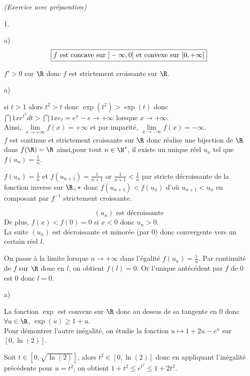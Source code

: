 \documentclass[11pt]{article}%
\begin{document}
\begin{exercice}{\it (Exercice avec préparation)}
\begin{noliste}{1.}
\begin{noliste}{a)}
\[
 \boxed{\text{$f$ est concave sur $ ]-\infty,0]$ et convexe sur $[0, +
\infty[$}}
\]
 \item $f' >0$ sur $\R$ donc $f$ est strictement croissante sur $\R$. 
 \end{noliste}
 \item \begin{noliste}{a)}
 \setlength{\itemsep}{2mm}
 \item si $t >1$ alors $t^{2} >t$ donc $\exp(t^{2}) > \exp(t)$ donc
$\dint{1}{x} e^{t^{2}}dt > \dint{1}{x} e_{t} = e^{x} - e \to + \infty $
lorsque $x \to + \infty$.\\
Ainsi, $\lim \limits_{x \to + \infty } f(x) = + \infty$ et par
imparité, $\lim \limits_{ x \to -\infty } f(x) = -\infty$.\\
 $f$ est continue et strictement croissante sur $\R$ donc réalise une
bijection de $\R$ dans $f(\R) = \R$ ainsi,pour tout $ n \in \N^*$, il
existe un unique réel $u_{n}$ tel que $f(u_{n}) = \frac{1}{n}$. 
 \item $f(u_{n}) = \frac{1}{n}$ et $f(u_{n + 1}) = \frac{1}{n + 1}$ or
$\frac{1}{n + 1} < \frac{1}{n}$ par stricte décroissante de la fonction
inverse sur $\R_{+}{*}$ donc $f(u_{n + 1}) < f(u_{n})$ d'où $u_{n + 1}
< u_{n}$ en composant par $f^{-1}$ strictement croissante.
 
\[
 \boxed{\text{$(u_{n})$ est décroissante}}
\]
 De plus, $f(x) < f(0) = 0$ si $x <0$ donc $u_{n} >0$. \\
 La suite $(u_{n})$ est décroissante et minorée (par 0) donc
convergente vers un certain réel $l$. 
 \item On passe à la limite lorsque $n \to + \infty$ dans l'égalité
$f(u_{n}) = \frac{1}{n}$. Par continuité de $f$ sur $\R$ donc en $l$,
on obtient $f(l) = 0$. Or l'unique antécédent par $f$ de 0 est 0 donc
$l = 0$.
 \end{noliste}
 \item \begin{noliste}{a)}
 \setlength{\itemsep}{2mm}
 \item La fonction $\exp$ est convexe sur $\R$ donc au dessus de sa
tangente en $0$ donc $\forall u\in \R$, $\exp(u) \geq 1 + u$. \\
 Pour démontrer l'autre inégalité, on étudie la fonction $u \mapsto 1 +
2u - e^{u}$ sur $[0, \ln(2)]$.
 \item Soit $t \in [0, \sqrt{\ln(2)}]$, alors $t^{2} \in [0, \ln(2)]$
donc en appliquant l'inégalité précédente pour $u = t^{2}$, on obtient
$ 1 + t^{2} \leq e^{t^{2}} \leq 1 + 2t^{2}$. \\


\end{noliste}
\end{noliste}
\end{exercice}
\end{document}
